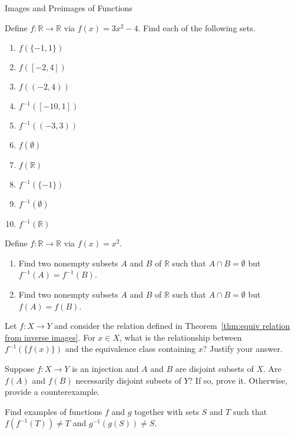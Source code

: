 \begin{section}{Images and Preimages of Functions}
\begin{problem}
Define $f:\mathbb{R}\to\mathbb{R}$ via $f(x)=3x^2-4$.
Find each of the following sets.
\begin{enumerate}[label=\textrm{(\alph*)}]
\item $f(\{-1,1\})$
\item $f([-2,4])$
\item $f((-2,4))$
\item $f^{-1}([-10,1])$
\item $f^{-1}((-3,3))$
\item $f(\emptyset)$
\item $f(\mathbb{R})$
\item $f^{-1}(\{-1\})$
\item $f^{-1}(\emptyset)$
\item $f^{-1}(\mathbb{R})$
\end{enumerate}
\end{problem}

\begin{problem}
Define $f:\mathbb{R}\to\mathbb{R}$ via $f(x)=x^2$.
\begin{enumerate}[label=\textrm{(\alph*)}]
\item Find two nonempty subsets $A$ and $B$ of $\mathbb{R}$ such that $A\cap B=\emptyset$ but $f^{-1}(A)=f^{-1}(B)$.
\item Find two nonempty subsets $A$ and $B$ of $\mathbb{R}$ such that $A\cap B=\emptyset$ but $f(A)=f(B)$.
\end{enumerate}
\end{problem}

\begin{problem}
Let $f:X\to Y$ and consider the relation defined in Theorem~\ref{thm:equiv relation from inverse images}. For $x\in X$, what is the relationship between $f^{-1}(\{f(x)\})$ and the equivalence class containing $x$?  Justify your answer.
\end{problem}

\begin{problem}
Suppose $f:X\to Y$ is an injection and $A$ and $B$ are disjoint subsets of $X$. Are $f(A)$ and $f(B)$ necessarily disjoint subsets of $Y$?  If so, prove it. Otherwise, provide a counterexample.
\end{problem}

\begin{problem}
Find examples of functions $f$ and $g$ together with sets $S$ and $T$ such that $f(f^{-1}(T))\neq T$ and $g^{-1}(g(S))\neq S$.
\end{problem}


\end{section}
